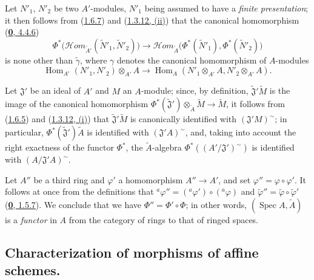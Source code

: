 \begin{env}[1.6.8]
\label{I.1.6.8}
Let $N'_1$, $N'_2$ be two $A'$-modules, $N'_1$ being assumed to have a
\emph{finite presentation}; it then follows from
(\hyperref[I.1.6.7]{1.6.7}) and
(\hyperref[I.1.3.12]{1.3.12, (ii)}) that the canonical homomorphism
(\hyperref[0.4.4.6]{\textbf{0}, 4.4.6})
\[
  \Phi^*\bigl(\mathscr{H}\!om_{\widetilde{A}'}
    (\widetilde{N}'_1,\widetilde{N}'_2)\bigr)
  \longrightarrow
  \mathscr{H}\!om_{\widetilde A}
    \bigl(\Phi^*(\widetilde{N}'_1),\Phi^*(\widetilde{N}'_2)\bigr)
\]
is none other than $\widetilde{\gamma}$, where $\gamma$ denotes
the canonical homomorphism of $A$-modules
\[
  \operatorname{Hom}_{A'}(N'_1,N'_2)\otimes_{A'}A
  \longrightarrow
  \operatorname{Hom}_A(N'_1\otimes_{A'}A,N'_2\otimes_{A'}A).
\]
\end{env}

\begin{env}[1.6.9]
\label{I.1.6.9}
Let $\mathfrak{J}'$ be an ideal of $A'$ and $M$ an $A$-module; since, by
definition, $\widetilde{\mathfrak{J}}'\widetilde M$ is the image of
the canonical homomorphism
$\Phi^*(\widetilde{\mathfrak{J}}')\otimes_{\widetilde A}\widetilde M
\to\widetilde M$, it follows from (\hyperref[I.1.6.5]{1.6.5}) and
(\hyperref[I.1.3.12]{1.3.12, (i)}) that
$\widetilde{\mathfrak{J}}'\widetilde M$ is canonically identified with
$(\mathfrak{J}'M)^{\sim}$; in particular,
$\Phi^*(\widetilde{\mathfrak{J}}')\widetilde A$ is identified with
$(\mathfrak{J}'A)^{\sim}$, and, taking into account the right exactness of
the functor $\Phi^*$, the $\widetilde A$-algebra
$\Phi^*((A'/\mathfrak{J}')^{\sim})$ is identified with
$(A/\mathfrak{J}'A)^{\sim}$.
\end{env}

\begin{env}[1.6.10]
\label{I.1.6.10}
Let $A''$ be a third ring and $\varphi'$ a homomorphism
$A''\to A'$, and set $\varphi''=\varphi\circ\varphi'$. It follows
at once from the definitions that
${}^a\varphi''=({}^a\varphi')\circ({}^a\varphi)$ and
$\widetilde{\varphi}''=\widetilde\varphi\circ\widetilde{\varphi}'$
(\hyperref[0.1.5.7]{\textbf{0}, 1.5.7}). We conclude that we have
$\Phi''=\Phi'\circ\Phi$; in other words,
$(\operatorname{Spec} A,\widetilde A)$ is a \emph{functor} in $A$ from the
category of rings to that of ringed spaces.
\end{env}

\subsection{Characterization of morphisms of affine schemes.}
\label{subsection:I.1.7}

